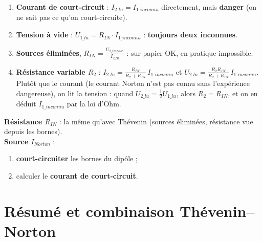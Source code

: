 
\begin{propbox}[title={Mesurer le modèle de Norton}]
\begin{enumerate}
  \item \textbf{Courant de court-circuit} : $I_{2\_lu} = I_{1\_inconnu}$ directement, mais
        \textbf{danger} (on ne sait pas ce qu'on court-circuite).
  \item \textbf{Tension à vide} : $U_{1\_lu} = R_{IN}\cdot I_{1\_inconnu}$ :
        \textbf{toujours deux inconnues}.
  \item \textbf{Sources éliminées}, $R_{IN} = \frac{U_{2\_impos\acute e}}{I_{2\_lu}}$ : sur
        papier OK, en pratique impossible.
  \item \textbf{Résistance variable $R_2$} :
        $I_{2\_lu} = \frac{R_{IN}}{R_2 + R_{IN}}\,I_{1\_inconnu}$ et
        $U_{2\_lu} = \frac{R_2 R_{IN}}{R_2 + R_{IN}}\,I_{1\_inconnu}$. Plutôt que le courant
        (le courant Norton n'est pas connu sans l'expérience dangereuse), on lit la tension :
        quand $U_{2\_lu} = \frac12 U_{1\_lu}$, alors $R_2 = R_{IN}$, et on en déduit
        $I_{1\_inconnu}$ par la loi d'Ohm.
\end{enumerate}
\end{propbox}


\begin{thmbox}[title=Méthode de base pour calculer le modèle de Norton]
\textbf{Résistance $R_{IN}$} : la même qu'avec Thévenin (sources éliminées, résistance vue
depuis les bornes). \\
\textbf{Source $I_{Norton}$} :
\begin{enumerate}
  \item \textbf{court-circuiter} les bornes du dipôle ;
  \item calculer le \textbf{courant de court-circuit}.
\end{enumerate}
\end{thmbox}

\section{Résumé et combinaison Thévenin--Norton}


